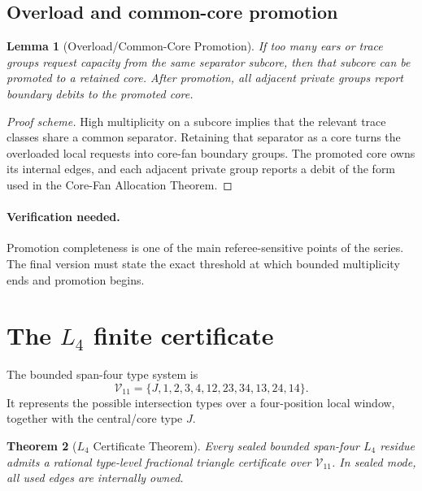 \documentclass[11pt]{article}
\newtheorem{theorem}{Theorem}[section]
\newtheorem{lemma}[theorem]{Lemma}
\theoremstyle{definition}
\newcommand{\calV}{\mathcal V}
\begin{document}
\subsection{Overload and common-core promotion}

\begin{lemma}[Overload/Common-Core Promotion]\label{lem:overload}
If too many ears or trace groups request capacity from the same separator subcore, then that subcore can be promoted to a retained core. After promotion, all adjacent private groups report boundary debits to the promoted core.
\end{lemma}

\begin{proof}[Proof scheme]
High multiplicity on a subcore implies that the relevant trace classes share a common separator. Retaining that separator as a core turns the overloaded local requests into core-fan boundary groups. The promoted core owns its internal edges, and each adjacent private group reports a debit of the form used in the Core-Fan Allocation Theorem.
\end{proof}

\paragraph{Verification needed.}
Promotion completeness is one of the main referee-sensitive points of the series. The final version must state the exact threshold at which bounded multiplicity ends and promotion begins.

\section{The \(L_4\) finite certificate}

The bounded span-four type system is
\[
    \calV_{11}
    =
    \{J,1,2,3,4,12,23,34,13,24,14\}.
\]
It represents the possible intersection types over a four-position local window, together with the central/core type \(J\).

\begin{theorem}[\(L_4\) Certificate Theorem]\label{thm:l4}
Every sealed bounded span-four \(L_4\) residue admits a rational type-level fractional triangle certificate over \(\calV_{11}\). In sealed mode, all used edges are internally owned.
\end{theorem}
\end{document}
